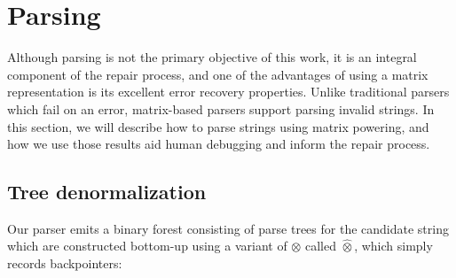 \documentclass[sigplan,review,anonymous,acmsmall]{acmart}\settopmatter{printfolios=false,printccs=false,printacmref=false}
\begin{document}
%
%

\pagebreak\section{Parsing}\label{sec:parsing}

Although parsing is not the primary objective of this work, it is an integral component of the repair process, and one of the advantages of using a matrix representation is its excellent error recovery properties. Unlike traditional parsers which fail on an error, matrix-based parsers support parsing invalid strings. In this section, we will describe how to parse strings using matrix powering, and how we use those results aid human debugging and inform the repair process.

\subsection{Tree denormalization}\label{sec:denormalization}


Our parser emits a binary forest consisting of parse trees for the candidate string which are constructed bottom-up using a variant of $\otimes$ called $\hat{\otimes}$, which simply records backpointers:
\end{document}
